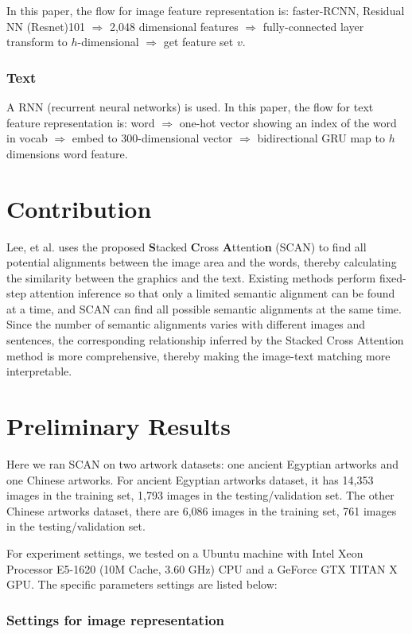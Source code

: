 In this paper, the flow for image feature representation is: faster-RCNN, Residual NN (Resnet)101 $\Rightarrow$ 2,048 dimensional features $\Rightarrow$ fully-connected layer transform to $h$-dimensional $\Rightarrow$ get feature set $v$.

\subsubsection{Text}A RNN (recurrent neural networks) is used. In this paper, the flow for text feature representation is: word $\Rightarrow$ one-hot vector showing an index of the word in vocab $\Rightarrow$ embed to 300-dimensional vector $\Rightarrow$ bidirectional GRU map to $h$ dimensions word feature.

\section{Contribution}
Lee, et al. \cite{scan} uses the proposed \textbf{S}tacked \textbf{C}ross \textbf{A}ttentio\textbf{n} (SCAN) to find all potential alignments between the image area and the words, thereby calculating the similarity between the graphics and the text. Existing methods perform fixed-step attention inference so that only a limited semantic alignment can be found at a time, and SCAN can find all possible semantic alignments at the same time. Since the number of semantic alignments varies with different images and sentences, the corresponding relationship inferred by the Stacked Cross Attention method is more comprehensive, thereby making the image-text matching more interpretable.


\section{Preliminary Results}
Here we ran SCAN on two artwork datasets: one ancient Egyptian artworks and one Chinese artworks. For ancient Egyptian artworks dataset, it has 14,353 images in the training set, 1,793 images in the testing/validation set. The other Chinese artworks dataset, there are 6,086 images in the training set, 761 images in the testing/validation set.

For experiment settings, we tested on a Ubuntu machine with Intel Xeon Processor E5-1620 (10M Cache, 3.60 GHz) CPU and a GeForce GTX TITAN X GPU. The specific parameters settings are listed below:

\subsubsection{Settings for image representation}

